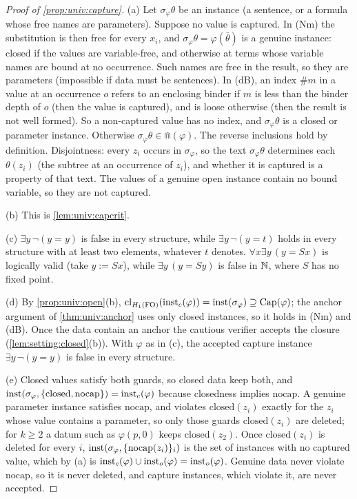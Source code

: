 \begin{proof}[Proof of \cref{prop:univ:capture}]
(a) Let $\sigma_\varphi\theta$ be an instance (a sentence, or a formula whose free names are parameters). Suppose no value is captured. In (Nm) the substitution is then free for every $x_i$, and $\sigma_\varphi\theta=\varphi(\bar\theta)$ is a genuine instance: closed if the values are variable-free, and otherwise at terms whose variable names are bound at no occurrence. Such names are free in the result, so they are parameters (impossible if data must be sentences). In (dB), an index $\#m$ in a value at an occurrence $o$ refers to an enclosing binder if $m$ is less than the binder depth of $o$ (then the value is captured), and is loose otherwise (then the result is not well formed). So a non-captured value has no index, and $\sigma_\varphi\theta$ is a closed or parameter instance. Otherwise $\sigma_\varphi\theta\in\Cap(\varphi)$. The reverse inclusions hold by definition. Disjointness: every $z_i$ occurs in $\sigma_\varphi$, so the text $\sigma_\varphi\theta$ determines each $\theta(z_i)$ (the subtree at an occurrence of $z_i$), and whether it is captured is a property of that text. The values of a genuine open instance contain no bound variable, so they are not captured.

(b) This is \cref{lem:univ:capcrit}.

(c) $\exists y\,\neg(y=y)$ is false in every structure, while $\exists y\,\neg(y=t)$ holds in every structure with at least two elements, whatever $t$ denotes. $\forall x\exists y\,(y=Sx)$ is logically valid (take $y:=Sx$), while $\exists y\,(y=Sy)$ is false in $\mathbb{N}$, where $S$ has no fixed point.

(d) By \cref{prop:univ:open}(b), $\mathrm{cl}_{H_{1}(\mathrm{FO})}(\mathrm{inst}_{c}(\varphi))=\mathrm{inst}(\sigma_\varphi)\supseteq\mathrm{Cap}(\varphi)$; the anchor argument of \cref{thm:univ:anchor} uses only closed instances, so it holds in (Nm) and (dB). Once the data contain an anchor the cautious verifier accepts the closure (\cref{lem:setting:closed}(b)). With $\varphi$ as in (c), the accepted capture instance $\exists y\,\neg(y=y)$ is false in every structure.

(e) Closed values satisfy both guards, so closed data keep both, and $\mathrm{inst}(\sigma_\varphi,\{\mathrm{closed},\mathrm{nocap}\})=\mathrm{inst}_{c}(\varphi)$ because closedness implies $\mathrm{nocap}$. A genuine parameter instance satisfies $\mathrm{nocap}$, and violates $\mathrm{closed}(z_i)$ exactly for the $z_i$ whose value contains a parameter, so only those guards $\mathrm{closed}(z_i)$ are deleted; for $k\ge2$ a datum such as $\varphi(p,0)$ keeps $\mathrm{closed}(z_2)$. Once $\mathrm{closed}(z_i)$ is deleted for every $i$, $\mathrm{inst}(\sigma_\varphi,\{\mathrm{nocap}(z_i)\}_i)$ is the set of instances with no captured value, which by (a) is $\mathrm{inst}_{c}(\varphi)\cup\mathrm{inst}_{o}(\varphi)=\mathrm{inst}_{o}(\varphi)$. Genuine data never violate $\mathrm{nocap}$, so it is never deleted, and capture instances, which violate it, are never accepted.
\end{proof}

